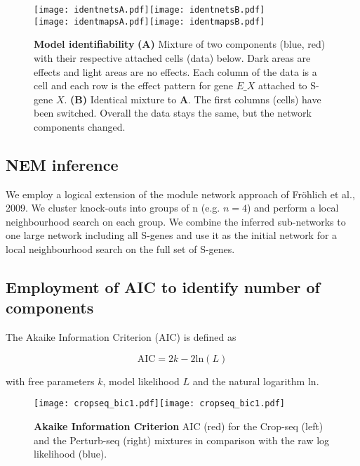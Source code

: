 \documentclass[12pt]{article}
\begin{document}
\begin{figure}
\begin{center}
\texttt{[image: identnetsA.pdf]}\hspace{2cm}\texttt{[image: identnetsB.pdf]}\\
\texttt{[image: identmapsA.pdf]}\hspace{2cm}\texttt{[image: identmapsB.pdf]}
\caption{\textbf{Model identifiability} \textbf{(A)} Mixture of two components (blue, red) with their respective attached cells (data) below. Dark areas are effects and light areas are no effects. Each column of the data is a cell and each row is the effect pattern for gene $E\_X$ attached to S-gene $X$. \textbf{(B)} Identical mixture to \textbf{A}. The first columns (cells) have been switched. Overall the data stays the same, but the network components changed.}\label{fig:ident}
\end{center}
\end{figure}

\subsection{NEM inference}

We employ a logical extension of the module network approach of Fröhlich et al., 2009. We cluster knock-outs into groups of n (e.g. $n=4$) and perform a local neighbourhood search on each group. We combine the inferred sub-networks to one large network including all S-genes and use it as the initial network for a local neighbourhood search on the full set of S-genes.

\subsection{Employment of AIC to identify number of components}

The Akaike Information Criterion (AIC) is defined as

\begin{equation}
\mathrm{AIC} = 2k - 2\mathrm{ln}\left(L\right)
\end{equation}

with free parameters $k$, model likelihood $L$ and the natural logarithm $\mathrm{ln}$.

\begin{figure}
\texttt{[image: cropseq\_bic1.pdf]}\texttt{[image: cropseq\_bic1.pdf]}
\caption{\textbf{Akaike Information Criterion} AIC (red) for the Crop-seq (left) and the Perturb-seq (right) mixtures in comparison with the raw log likelihood (blue).}\label{fig:bics}
\end{figure}
\end{document}
